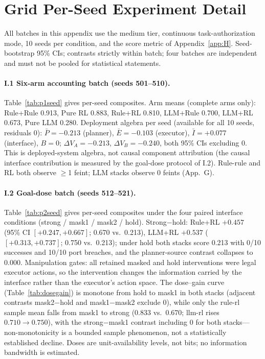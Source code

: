 \documentclass[sigconf,anonymous]{aamas}
\newcommand{\sapp}[1]{App.~#1}
\begin{document}
\section{Grid Per-Seed Experiment Detail}\label{app:I}

All batches in this appendix use the medium tier, continuous task-authorization mode, 10 seeds per condition, and the score metric of Appendix~\ref{app:H}. Seed-bootstrap 95\% CIs; contrasts strictly within batch; four batches are independent and must not be pooled for statistical statements.

\paragraph{I.1 Six-arm accounting batch (seeds 501--510).}
Table~\ref{tab:p1seed} gives per-seed composites. Arm means (complete arms only): Rule+Rule 0.913, Pure RL 0.883, Rule+RL 0.810, LLM+Rule 0.700, LLM+RL 0.673, Pure LLM 0.280. Deployment algebra per seed (available for all 10 seeds, residuals 0): $\bar P = -0.213$ (planner), $\bar E = -0.103$ (executor), $\bar I = +0.077$ (interface), $B = 0$; $\Delta V_A = -0.213$, $\Delta V_B = -0.240$, both 95\% CIs excluding 0. This is deployed-system algebra, not causal component attribution (the causal interface contribution is measured by the goal-dose protocol of I.2). Rule-rule and RL both observe $\geq$1 feint; LLM stacks observe 0 feints (\sapp{G}).



\paragraph{I.2 Goal-dose batch (seeds 512--521).}
Table~\ref{tab:p2seed} gives per-seed composites under the four paired interface conditions (strong / mask1 / mask2 / hold). Strong$-$hold: Rule+RL $+0.457$ (95\% CI $[+0.247, +0.667]$; 0.670 vs.\ 0.213), LLM+RL $+0.537$ ($[+0.313, +0.737]$; 0.750 vs.\ 0.213); under hold both stacks score 0.213 with 0/10 successes and 10/10 port breaches, and the planner-source contrast collapses to 0.000. Manipulation gates: all retained masked and hold interventions were legal executor actions, so the intervention changes the information carried by the interface rather than the executor's action space. The dose--gain curve (Table~\ref{tab:dosegain}) is monotone from hold to mask1 in both stacks (adjacent contrasts mask2$-$hold and mask1$-$mask2 exclude 0), while only the rule-rl sample mean falls from mask1 to strong (0.833 vs.\ 0.670; llm-rl rises $0.710 \to 0.750$), with the strong$-$mask1 contrast including 0 for both stacks---non-monotonicity is a bounded sample phenomenon, not a statistically established decline. Doses are unit-availability levels, not bits; no information bandwidth is estimated.
\end{document}
